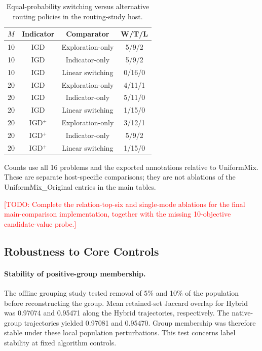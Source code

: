 \documentclass[final,5p,times,twocolumn]{elsarticle}
\newcommand{\TODO}[1]{\textcolor{red}{[TODO: #1]}}
\begin{document}
\begin{table}[t]
\centering
\caption{Equal-probability switching versus alternative routing policies in the routing-study host.}
\label{tab:exp:routing}
\scriptsize
\setlength{\tabcolsep}{3pt}
\renewcommand{\arraystretch}{1.12}
\begin{tabular}{lccc}
\toprule
$M$ & Indicator & Comparator & W/T/L \\
\midrule
10 & IGD & Exploration-only & 5/9/2 \\
10 & IGD & Indicator-only & 5/9/2 \\
10 & IGD & Linear switching & 0/16/0 \\
\midrule
20 & IGD & Exploration-only & 4/11/1 \\
20 & IGD & Indicator-only & 5/11/0 \\
20 & IGD & Linear switching & 1/15/0 \\
\midrule
20 & IGD$^+$ & Exploration-only & 3/12/1 \\
20 & IGD$^+$ & Indicator-only & 5/9/2 \\
20 & IGD$^+$ & Linear switching & 1/15/0 \\
\bottomrule
\end{tabular}
\par\smallskip
\begin{minipage}{\linewidth}
\scriptsize Counts use all 16 problems and the exported annotations relative to UniformMix. These are separate host-specific comparisons; they are not ablations of the UniformMix\_Original entries in the main tables.
\end{minipage}
\end{table}

\TODO{Complete the relation-top-six and single-mode ablations for the
final main-comparison implementation, together with the missing
10-objective candidate-value probe.}

\subsection{Robustness to Core Controls}
\label{sec:exp:sensitivity}

\paragraph{Stability of positive-group membership.}
The offline grouping study tested removal of 5\% and 10\% of the
population before reconstructing the group. Mean retained-set Jaccard
overlap for Hybrid was 0.97074 and 0.95471 along the Hybrid trajectories,
respectively. The native-group trajectories yielded 0.97081 and
0.95470. Group membership was therefore stable under these local
population perturbations. This test concerns label stability at fixed
algorithm controls.
\end{document}
